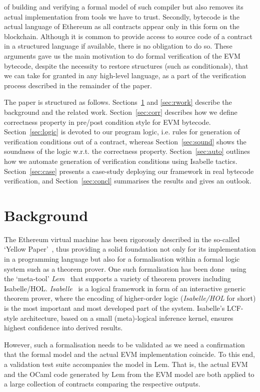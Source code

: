 \documentclass[sigplan,10pt,review]{acmart}\settopmatter{printfolios=true,printccs=false,printacmref=false}
\begin{document}
of building and verifying a formal model of such compiler but also removes its actual implementation from tools we have to trust.
Secondly, bytecode is the actual language of Ethereum as all contracts appear only in this form on the blockchain.
Although it is common to provide access to source code of a contract in a structured language if available, there is
no obligation to do so. These arguments gave us the main motivation to do formal verification of
the EVM bytecode, despite the necessity to restore structures (such as conditionals), that we can take 
for granted in any high-level language,
as a part of the verification process described in the remainder of the paper. 
         
The paper is structured as follows. Sections~\ref{sec:bg} and \ref{sec:rwork} describe the background
and the related work. Section~\ref{sec:corr} describes how we define correctness property in pre/post condition
style for EVM bytecode. Section~\ref{sec:logic} is devoted to our program logic, i.e. rules for generation
of verification conditions out of a contract, whereas Section~\ref{sec:sound} shows the soundness of the logic
w.r.t. the correctness property. Section~\ref{sec:auto} outlines how we automate generation of verification
conditions using Isabelle tactics. Section~\ref{sec:case} presents a case-study deploying our framework in 
real bytecode verification, and
Section~\ref{sec:concl} summarises the results and gives an outlook.      
%
\section{Background} 
\label{sec:bg}
The Ethereum virtual machine has been rigorously described in the so-called `Yellow Paper'~\cite{wood2014ethereum},
thus providing a solid foundation not only for its implementation in a programming language 
but also for a formalisation within a formal logic system such as a theorem prover.
One such formalisation has been done~\cite{Yoichi} using the `meta-tool' \emph{Lem}~\cite{DBLP:conf/icfp/MulliganOGRS14}
that supports a variety of theorem provers including Isabelle/HOL.
\emph{Isabelle}~\cite{Nipkow_PW:Isabelle} is a logical framework in form of an interactive generic theorem prover,
where the encoding of higher-order logic (\emph{Isabelle/HOL} for short)
is the most important and most developed part of the system. Isabelle's LCF-style architecture,
based on a small (meta)-logical inference kernel, ensures highest confidence into derived results.
 
However, such a formalisation needs to be validated as we need a confirmation that the formal model
and the actual EVM implementation coincide. To this end, a validation test suite accompanies
the model in Lem. That is, the actual EVM and the OCaml code generated by Lem from the EVM model
are both applied to a large collection of contracts comparing the respective outputs.  
\end{document}
